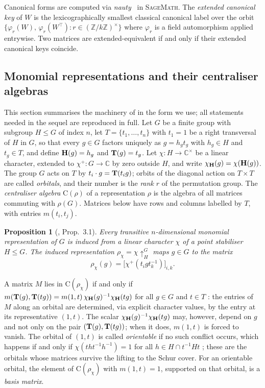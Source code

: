 \documentclass{article}
\newtheorem{proposition}[theorem]{Proposition}
\theoremstyle{definition}
\theoremstyle{remark}
\newcommand{\Z}{\mathbb{Z}}
\newcommand{\Cr}{\mathrm{C}}
\newcommand\myH{{\bf H}}
\newcommand\myT{{\bf T}}
\newcommand\myU{\chi_{{\bf H}}}
\newcommand{\myuparrow}{\!\uparrow}
\begin{document}
Canonical forms are computed via \textit{nauty}~\cite{McKay2014} in \textsc{SageMath}. The \textit{extended canonical key} of $W$ is the lexicographically smallest classical canonical label over the orbit
$\{\varphi_r(W),\,\varphi_r(W^\top): r\in(\Z/k\Z)^\times\}$ where  $\varphi_{r}$ is a field automorphism applied entrywise. Two matrices are extended-equivalent if and only if their extended canonical keys coincide.

\subsection{Monomial representations and their centraliser algebras}

This section summarises the machinery of \cite[Sections~3 and~5]{Monrep}
in the form we use; all statements needed in the sequel are reproduced in
full.  Let $G$ be a finite group with subgroup $H \leq G$ of index $n$,
let $T = \{t_1, \ldots, t_n\}$ with $t_1 = 1$ be a right transversal of
$H$ in $G$, so that every $g \in G$ factors uniquely as $g = h_g t_g$ with
$h_g \in H$ and $t_g \in T$, and define $\myH(g) = h_g$ and
$\myT(g) = t_g$.  Let $\chi \colon H \rightarrow \mathbb{C}^{\times}$ be a
linear character, extended to $\chi^{+} \colon G \rightarrow \mathbb{C}$
by zero outside $H$, and write $\myU(g) = \chi(\myH(g))$.  The group $G$
acts on $T$ by $t_i \cdot g = \myT(t_i g)$; orbits of the diagonal action
on $T \times T$ are called \textit{orbitals}, and their number is the
\textit{rank} $r$ of the permutation group.  The \textit{centraliser
algebra} $\Cr(\rho)$ of a representation $\rho$ is the algebra of all
matrices commuting with $\rho(G)$.  Matrices below have rows and columns
labelled by $T$, with entries $m(t_i, t_j)$.

\begin{proposition}[\cite{Monrep}, Prop.~3.1]\label{prop:monrep}
Every transitive $n$-dimensional monomial representation of $G$ is induced from a linear character $\chi$ of a point stabiliser $H \leq G$. The induced representation $\rho_\chi = \chi \myuparrow_H^G$ maps $g \in G$ to the matrix
\[
\rho_\chi(g) = \bigl[\chi^{+}(t_i g t_k^{-1})\bigr]_{i,k}.
\]
\end{proposition}

A matrix $M$ lies in $\Cr(\rho_\chi)$ if and only if
$m(\myT(g), \myT(tg)) = m(1, t)\,\myU(g)^{-1}\myU(tg)$ for all $g \in G$
and $t \in T$ \cite[Prop.~3.2]{Monrep}: the entries of $M$ along an
orbital are determined, via explicit character values, by the entry at
its representative $(1,t)$.  The scalar $\myU(g)^{-1}\myU(tg)$ may,
however, depend on $g$ and not only on the pair
$(\myT(g), \myT(tg))$; when it does, $m(1,t)$ is forced to vanish.  The
orbital of $(1,t)$ is called \emph{orientable} if no such conflict
occurs, which happens if and only if $\chi(tht^{-1}h^{-1}) = 1$ for all
$h \in H \cap t^{-1}Ht$ \cite[Def.~3.3 and Prop.~3.6]{Monrep}; these are the
orbitals whose matrices survive the lifting to the Schur cover.  For an
orientable orbital, the element of $\Cr(\rho_\chi)$ with $m(1,t) = 1$,
supported on that orbital, is a \emph{basis matrix}.
\end{document}

